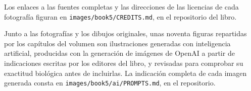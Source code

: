 Los enlaces a las fuentes completas y las direcciones de las licencias
de cada fotografía figuran en
\texttt{images/\allowbreak book5/\allowbreak CREDITS.md}, en el repositorio del libro.

\bigskip
Junto a las fotografías y los dibujos originales, unas noventa figuras
repartidas por los capítulos del volumen son ilustraciones generadas
con inteligencia artificial, producidas con la generación de imágenes
de OpenAI a partir de indicaciones escritas por los editores del
libro, y revisadas para comprobar su exactitud biológica antes de
incluirlas. La indicación completa de cada imagen generada consta en
\texttt{images/\allowbreak book5/\allowbreak ai/\allowbreak PROMPTS.md}, en el repositorio.
\par\endgroup
\clearpage
